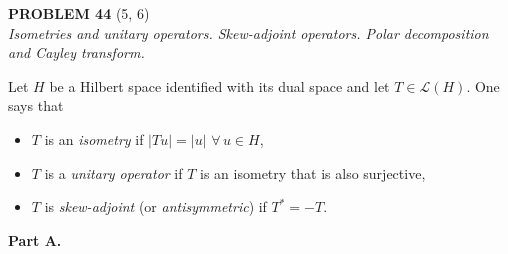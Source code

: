 \documentclass[12pt]{article}
\newcommand{\abs}[1]{\left|#1\right|}
\begin{document}
\bigskip
 
\noindent\textbf{PROBLEM 44} (5, 6)\\[4pt]
\textit{Isometries and unitary operators. Skew-adjoint operators.
Polar decomposition and Cayley transform.}
 
\medskip
 
Let $H$ be a Hilbert space identified with its dual space and let $T \in \mathcal{L}(H)$.
One says that
\begin{itemize}
\item[(i)] $T$ is an \emph{isometry} if $\abs{Tu} = \abs{u}$ $\forall\, u \in H$,
\item[(ii)] $T$ is a \emph{unitary operator} if $T$ is an isometry that is also surjective,
\item[(iii)] $T$ is \emph{skew-adjoint} (or \emph{antisymmetric}) if $T^* = -T$.
\end{itemize}
 
\noindent\textbf{Part A.}
 
\end{document}
